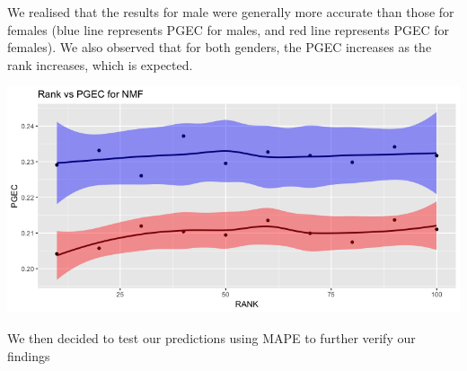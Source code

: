 \documentclass{article}
\begin{document}
We realised that the results for male were generally more accurate than those for females (blue line represents PGEC for males, and red line represents PGEC for females). We also observed that for both genders, the PGEC increases as the rank increases, which is expected. 

\includegraphics[scale=0.5]{RankvsPGEC.png}

We then decided to test our predictions using MAPE to further verify our findings
\end{document}

